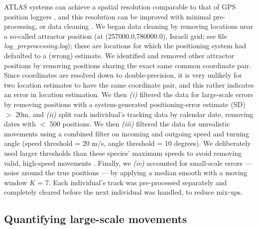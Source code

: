 ATLAS systems can achieve a spatial resolution comparable to that of GPS position loggers \citep{beardsworth2021}, and this resolution can be improved with minimal pre-processing, or data cleaning \citep{beardsworth2021, gupte2021b}.
We began data cleaning by removing locations near a so-called attractor position (at (257000.0,780000.0), Israeli grid; see file \textit{log\_preprocessing.log}); these are locations for which the positioning system had defaulted to a (wrong) estimate.
We identified and removed other attractor positions by removing positions sharing the exact same common coordinate pair. 
Since coordinates are resolved down to double-precision, it is very unlikely for two location estimates to have the same coordinate pair, and this rather indicates an error in location estimation.
%
We then \textit{(i)} filtered the data for large-scale errors by removing positions with a system-generated positioning-error estimate (SD) $>$ 20m, and \textit{(ii)} split each individual's tracking data by calendar date, removing dates with $<$ 500 positions. We then \textit{(iii)} filtered the data for unrealistic movements using a combined filter on incoming and outgoing speed and turning angle (speed threshold = 20 m/s, angle threshold = 10 degrees).
We deliberately used larger thresholds than these species' maximum speeds to avoid removing valid, high-speed movements \citep{gupte2021b}.
Finally, we \textit{(iv)} accounted for small-scale errors --- noise around the true positions --- by applying a median smooth with a moving window $K$ = 7.
Each individual's track was pre-processed separately and completely cleared before the next individual was handled, to reduce mix-ups.

\subsection*{Quantifying large-scale movements}

